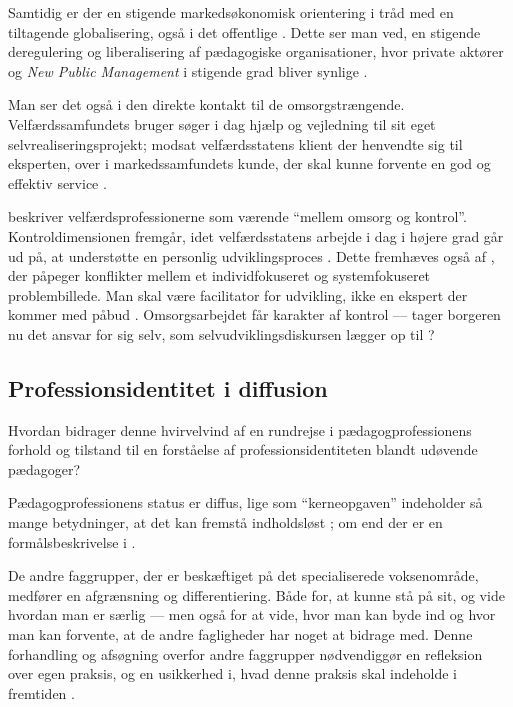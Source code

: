 Samtidig er der en stigende markedsøkonomisk orientering i tråd med en tiltagende globalisering, også i det offentlige \autocite[s. 161]{kofodOrganisationOgLedelse2016}.
Dette ser man ved, en stigende deregulering og liberalisering af pædagogiske organisationer, hvor private aktører og \textit{New Public Management} i stigende grad bliver synlige \autocite[s. 161]{kofodOrganisationOgLedelse2016}.

Man ser det også i den direkte kontakt til de omsorgstrængende. Velfærdssamfundets bruger søger i dag hjælp og vejledning til sit eget selvrealiseringsprojekt; modsat velfærdsstatens klient der henvendte sig til eksperten, over i markedssamfundets kunde, der skal kunne forvente en god og effektiv service \autocite[s. 41f ]{hansbolKonstruktionAfProfessionel2008}.

\citeauthor{frederiksenVelfaerdsprofessionerMellemOmsorg2017} beskriver velfærdsprofessionerne som værende “mellem omsorg og kontrol”. 
Kontroldimensionen fremgår, idet velfærdsstatens arbejde i dag i højere grad går ud på, at understøtte en personlig udviklingsproces \autocite[s. 461]{frederiksenVelfaerdsprofessionerMellemOmsorg2017}.
Dette fremhæves også af \citeauthor{mik-meyerIndledningSkabeProfessionel2012}, der påpeger konflikter mellem et individfokuseret og systemfokuseret problembillede.
Man skal være facilitator for udvikling, ikke en ekspert der kommer med påbud \autocite[s. 74ff]{mik-meyerIndledningSkabeProfessionel2012}.
Omsorgsarbejdet får karakter af kontrol --- tager borgeren nu det ansvar for sig selv, som selvudviklingsdiskursen lægger op til \autocite[s. 461]{frederiksenVelfaerdsprofessionerMellemOmsorg2017}?


\subsection{Professionsidentitet i diffusion}
Hvordan bidrager denne hvirvelvind af en rundrejse i pædagogprofessionens forhold og tilstand til en forståelse af professionsidentiteten blandt udøvende pædagoger?

Pædagogprofessionens status er diffus, lige som “kerneopgaven” indeholder så mange betydninger, at det kan fremstå indholdsløst \autocite[s.314f]{porsKerneloseKerneopgaverSkolen2015}; om end der er en formålsbeskrivelse i .

De andre faggrupper, der er beskæftiget på det specialiserede voksenområde, medfører en afgrænsning og differentiering. Både for, at kunne stå på sit, og vide hvordan man er særlig --- men også for at vide, hvor man kan byde ind og hvor man kan forvente, at de andre fagligheder har noget at bidrage med.
Denne forhandling og afsøgning overfor andre faggrupper nødvendiggør en refleksion over egen praksis, og en usikkerhed i, hvad denne praksis skal indeholde i fremtiden \autocite[s 312f]{porsKerneloseKerneopgaverSkolen2015}.


